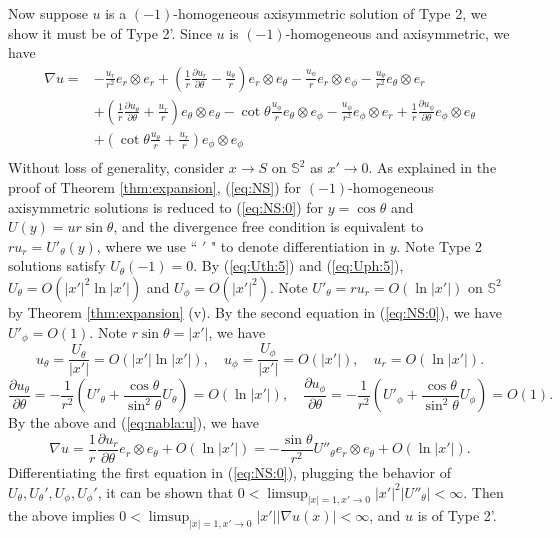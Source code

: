 \documentclass[12pt]{article}
\newcommand{\bS}{\mathbb{S}}
\begin{document}
Now suppose $u$ is a $(-1)$-homogeneous axisymmetric solution of Type 2, we show it must be of Type 2'. Since $u$ is $(-1)$-homogeneous and axisymmetric, we have 
\begin{equation}\label{eq:nabla:u}
\begin{split}
	\nabla u
	= & -\frac{u_r}{r^2}e_r\otimes e_r+(\frac{1}{r}\frac{\partial u_r}{\partial \theta}-\frac{u_{\theta}}{r})e_r\otimes e_{\theta}-\frac{u_{\phi}}{r}e_{r}\otimes e_{\phi}	- \frac{u_{\theta}}{r^2}e_{\theta}\otimes e_r \\
	& +(\frac{1}{r}\frac{\partial u_{\theta}}{\partial \theta}+\frac{u_{r}}{r})e_{\theta}\otimes e_{\theta} - \cot\theta\frac{u_{\phi}}{r}e_{\theta}\otimes e_{\phi}
	-\frac{u_{\phi}}{r^2}e_{\phi}\otimes e_r+\frac{1}{r}\frac{\partial u_{\phi}}{\partial \theta}e_{\phi}\otimes e_{\theta} \\
	& + (\cot\theta\frac{u_{\theta}}{r}+\frac{u_{r}}{r})e_{\phi}\otimes e_{\phi} \\
\end{split}
\end{equation}
Without loss of generality, consider $x\to S$ on $\mathbb{S}^2$ as $x'\to 0$. As explained in the proof of Theorem \ref{thm:expansion}, (\ref{eq:NS}) for $(-1)$-homogeneous axisymmetric solutions is reduced to (\ref{eq:NS:0}) for $y=\cos\theta$ and $U(y)=ur\sin\theta$, and the divergence free condition is equivalent to $ru_r=U'_{\theta}(y)$, where we use `` $'$ " to denote differentiation in $y$. Note Type 2 solutions satisfy $U_{\theta}(-1)=0$. By (\ref{eq:Uth:5}) and (\ref{eq:Uph:5}), $U_{\theta}=O(|x'|^2\ln |x'|)$ and $U_{\phi}=O(|x'|^2)$. Note $U'_{\theta}=ru_r=O(\ln |x'|)$ on $\bS^2$ by Theorem \ref{thm:expansion} (v). By the second equation in (\ref{eq:NS:0}), we have $U'_{\phi}=O(1)$. Note $r\sin\theta=|x'|$, we have 
\[
	u_{\theta}=\frac{U_{\theta}}{|x'|}=O(|x'| \ln |x'|), \quad u_{\phi}=\frac{U_{\phi}}{|x'|}=O(|x'|), \quad u_r=O(\ln |x'|).
\]
\[
	\frac{\partial u_{\theta}}{\partial\theta}=-\frac{1}{r^2}(U'_{\theta}+\frac{\cos\theta}{\sin^2\theta}U_{\theta})=O(\ln |x'|), \quad \frac{\partial u_{\phi}}{\partial \theta}=-\frac{1}{r^2}(U'_{\phi}+\frac{\cos\theta}{\sin^2\theta}U_{\phi})=O(1). 
\]
By the above and (\ref{eq:nabla:u}), we have 
\[
	\nabla u=\frac{1}{r}\frac{\partial u_r}{\partial \theta}e_r\otimes e_{\theta}+O(\ln |x'|)=-\frac{\sin\theta}{r^2}U''_{\theta}e_r\otimes e_{\theta}+O(\ln |x'|). 
\]
Differentiating the first equation in (\ref{eq:NS:0}), plugging the behavior of $U_{\theta}, U_{\theta}', U_{\phi}, U_{\phi}'$, it can be shown that $0<\limsup_{|x|=1, x'\to 0}|x'|^2|U''_{\theta}|<\infty$. Then the above implies $0<\limsup_{|x|=1,x'\to 0}|x'||\nabla u(x)|<\infty$, and $u$ is of Type 2'. 
\end{document}
